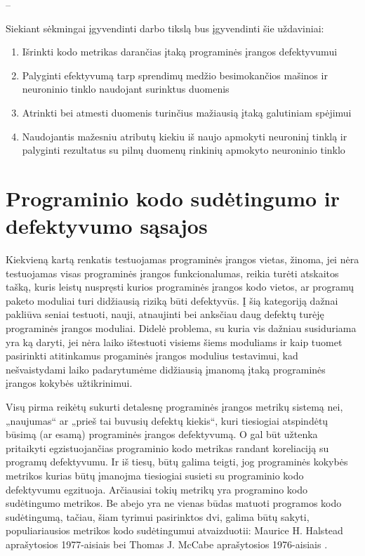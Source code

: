 \documentclass{VUMIFPSbakalaurinis}
\begin{document}
--

Siekiant sėkmingai įgyvendinti darbo tikslą bus įgyvendinti šie uždaviniai:
\begin{enumerate}
\item Išrinkti kodo metrikas darančias įtaką programinės įrangos defektyvumui
\item Palyginti efektyvumą tarp sprendimų medžio besimokančios mašinos ir neuroninio tinklo naudojant surinktus duomenis
\item Atrinkti bei atmesti duomenis turinčius mažiausią įtaką galutiniam spėjimui
\item Naudojantis mažesniu atributų kiekiu iš naujo apmokyti neuroninį tinklą ir palyginti rezultatus su pilnų duomenų rinkinių apmokyto neuroninio tinklo
\end{enumerate}
 
\section{Programinio kodo sudėtingumo ir defektyvumo sąsajos}
Kiekvieną kartą renkatis testuojamas programinės įrangos vietas, žinoma, jei nėra testuojamas visas programinės įrangos funkcionalumas, reikia turėti atskaitos tašką, kuris leistų nuspręsti kurios programinės įrangos kodo vietos, ar programų paketo moduliai turi didžiausią riziką būti defektyvūs. Į šią kategoriją dažnai pakliūva seniai testuoti, nauji, atnaujinti bei anksčiau daug defektų turėję programinės įrangos moduliai. Didelė problema, su kuria vis dažniau susiduriama yra ką daryti, jei nėra laiko ištestuoti visiems šiems moduliams ir kaip tuomet pasirinkti atitinkamus progaminės įrangos modulius testavimui, kad nešvaistydami laiko padarytumėme didžiausią įmanomą įtaką programinės įrangos kokybės užtikrinimui. 

Visų pirma reikėtų sukurti detalesnę programinės įrangos metrikų sistemą nei, „naujumas“ ar „prieš tai buvusių defektų kiekis“, kuri tiesiogiai atspindėtų būsimą (ar esamą) programinės įrangos defektyvumą. O gal būt užtenka pritaikyti egzistuojančias programinio kodo metrikas randant koreliaciją su programų defektyvumu. Ir iš tiesų, būtų galima teigti, jog programinės kokybės metrikos kurias būtų įmanojma tiesiogiai susieti su programinio kodo defektyvumu egzituoja. Arčiausiai tokių metrikų yra programino kodo sudėtingumo metrikos. Be abejo yra ne vienas būdas matuoti programos kodo sudėtingumą, tačiau, šiam tyrimui pasirinktos dvi, galima būtų sakyti, populiariausios metrikos kodo sudėtingumui atvaizduotii: Maurice H. Halstead aprašytosios 1977-aisiais \cite{Halstead:1977:ESS:540137} bei Thomas J. McCabe aprašytosios 1976-aisiais \cite{McCabe:1976:CM:800253.807712}. 
\end{document}
